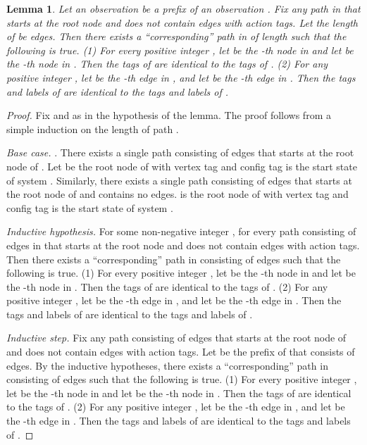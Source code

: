 \documentclass[11pt]{article}
\numberwithin{theorem}{section}
\newtheorem{lemma}[theorem]{Lemma}
\begin{document}
\begin{lemma}\label{lem:prefixObsYieldsSubtree}
Let an observation  be a prefix of an observation . Fix any path  in  that starts at the root node and does not contain edges with  action tags. Let the length of  be  edges. Then there exists a ``corresponding'' path  in  of length  such that the following is true. 
(1) For every positive integer , let  be the -th node in  and let  be the -th node in . Then the tags of  are identical to the tags of . (2) For any positive integer , let  be the -th edge in , and let  be the -th edge in . Then the tags and labels of  are identical to the tags and labels of .
\end{lemma}
\begin{proof}
Fix  and  as in the hypothesis of the lemma. The proof follows from a simple induction on the length  of path .

\emph{Base case.} . There exists a single path  consisting of  edges that starts at the root node of . Let  be the root node of  with vertex tag  and config tag  is the start state of  system . Similarly, there exists a single path  consisting of  edges that starts at the root node of  and contains no edges.  is the root node of  with vertex tag  and config tag  is the start state of  system .

\emph{Inductive hypothesis.} For some non-negative integer , for every path  consisting of  edges in  that starts at the root node and does not contain edges with  action tags. Then there exists a ``corresponding'' path  in  consisting of  edges such that the following is true. 
(1) For every positive integer , let  be the -th node in  and let  be the -th node in . Then the tags of  are identical to the tags of . (2) For any positive integer , let  be the -th edge in , and let  be the -th edge in . Then the tags and labels of  are identical to the tags and labels of .

\emph{Inductive step.} Fix any path  consisting of  edges that starts at the root node of  and does not contain edges with  action tags. Let  be the prefix of  that consists of  edges. By the inductive hypotheses, there exists a ``corresponding'' path  in  consisting of  edges such that the following is true. 
(1) For every positive integer , let  be the -th node in  and let  be the -th node in . Then the tags of  are identical to the tags of . (2) For any positive integer , let  be the -th edge in , and let  be the -th edge in . Then the tags and labels of  are identical to the tags and labels of .


\end{proof}
\end{document}
